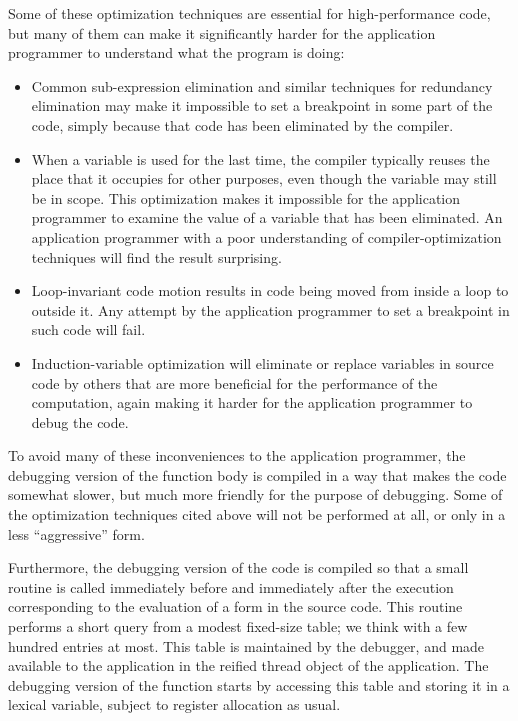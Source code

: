 Some of these optimization techniques are essential for
high-performance code, but many of them can make it significantly
harder for the application programmer to understand what the
program is doing:

\begin{itemize}
\item Common sub-expression elimination and similar techniques for
  redundancy elimination may make it impossible to set
  a breakpoint in some part of the code, simply because that code has
  been eliminated by the compiler.
\item When a variable is used for the last time, the compiler
  typically reuses the place that it occupies for other purposes, even
  though the variable may still be in scope.  This optimization makes
  it impossible for the application programmer to examine the value of
  a variable that has been eliminated.  An application programmer with
  a poor understanding of compiler-optimization techniques will find
  the result surprising.
\item Loop-invariant code motion results in code being moved from
  inside a loop to outside it.  Any attempt by the application
  programmer to set a breakpoint in such code will fail.
\item Induction-variable optimization will eliminate or replace
  variables in source code by others that are more beneficial for
  the performance of the computation, again making it harder for the
  application programmer to debug the code.
\end{itemize}

To avoid many of these inconveniences to the application programmer,
the debugging version of the function body is compiled in a way that
makes the code somewhat slower, but much more friendly for the purpose
of debugging.  Some of the optimization techniques cited above will
not be performed at all, or only in a less ``aggressive'' form.

Furthermore, the debugging version of the code is compiled so that a
small routine is called immediately before and immediately after the
execution corresponding to the evaluation of a form in the source
code.  This routine performs a short query from a modest fixed-size
table; we think with a few hundred entries at most.  This table is
maintained by the debugger, and made available to the application in
the reified thread object of the application.  The debugging version
of the function starts by accessing this table and storing it in a
lexical variable, subject to register allocation as usual.

